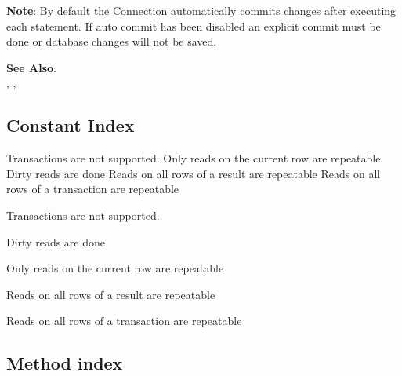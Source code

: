 {\bf Note}: By default the Connection automatically commits changes after
executing each statement. If auto commit has been disabled
an explicit commit must be done or database changes will not be saved.

{\bf See Also}: \\
     , ,  %

\subsection{Constant Index}

\begin{description}
     Transactions are not supported. 
     Only reads on the current row are repeatable 
     Dirty reads are done 
     Reads on all rows of a result are repeatable 
     Reads on all rows of a transaction are repeatable 
\end{description}

     Transactions are not supported. 

     Dirty reads are done 

     Only reads on the current row are repeatable 

     Reads on all rows of a result are repeatable 

     Reads on all rows of a transaction are repeatable 
     
\subsection{Method index}

